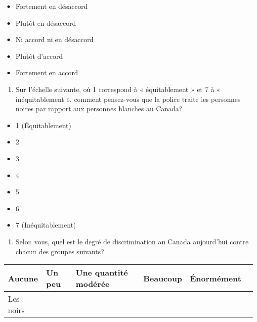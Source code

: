 \documentclass[
  letterpaper,
  DIV=11,
  numbers=noendperiod]{scrreprt}
\providecommand{\tightlist}{%
  \setlength{\itemsep}{0pt}\setlength{\parskip}{0pt}}\usepackage{longtable,booktabs,array}
\begin{document}
\begin{itemize}
\tightlist
\item
  Fortement en désaccord
\item
  Plutôt en désaccord
\item
  Ni accord ni en désaccord
\item
  Plutôt d'accord
\item
  Fortement en accord
\end{itemize}

\begin{enumerate}
\def\labelenumi{\arabic{enumi}.}
\setcounter{enumi}{46}
\tightlist
\item
  Sur l'échelle suivante, où 1 correspond à « équitablement » et 7 à «
  inéquitablement », comment pensez-vous que la police traite les
  personnes noires par rapport aux personnes blanches au Canada?
\end{enumerate}

\begin{itemize}
\tightlist
\item
  1 (Équitablement)
\item
  2
\item
  3
\item
  4
\item
  5
\item
  6
\item
  7 (Inéquitablement)
\end{itemize}

\begin{enumerate}
\def\labelenumi{\arabic{enumi}.}
\setcounter{enumi}{47}
\tightlist
\item
  Selon vous, quel est le degré de discrimination au Canada aujourd'hui
  contre chacun des groupes suivants?
\end{enumerate}

\begin{longtable}[]{@{}llllll@{}}
\toprule\noalign{}
Aucune & Un peu & Une quantité modérée & Beaucoup & Énormément & \\
\midrule\noalign{}
\endhead
\bottomrule\noalign{}
\endlastfoot
Les noirs & & & & & \\
\end{longtable}
\end{document}
